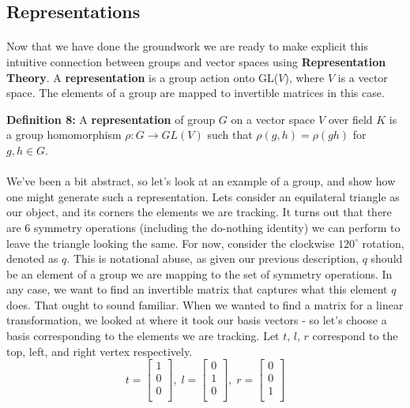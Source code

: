 \documentclass[twoside]{article}
\begin{document}
\begin{spacing}{1.25}
\section{Representations}
\paragraph*{} Now that we have done the groundwork we are ready to make 
explicit this intuitive connection between groups and vector spaces using 
\textbf{Representation Theory}. A \textbf{representation} is a group action onto GL($V$), 
where $V$ is a vector space. The elements of a group are mapped to invertible 
matrices in this case. 

\textbf{Definition 8:} A \textbf{representation} of group $G$ on a vector space 
$V$ over field $K$ is a group homomorphism $\rho: G \rightarrow GL(V)$ 
such that $\rho(g, h) = \rho(gh)$ for $g,h\in G$.

\paragraph*{} We've been a bit abstract, so let's look at an example of a group, 
and show how one might generate such a representation. Lets consider an equilateral 
triangle as our object, and its corners the elements we are tracking. It turns out 
that there are 6 symmetry operations (including the do-nothing identity) we can 
perform to leave the triangle looking the same. For now, consider the 
clockwise ${120}^{\circ}$ rotation, denoted as $q$. This is notational abuse, as given 
our previous description, $q$ should be an element of a group we are mapping to the 
set of symmetry operations. 
In any case, we want to find an invertible matrix 
that captures what this element $q$ does. That ought to sound familiar. When we wanted 
to find a matrix for a linear transformation, we looked at where it took our basis 
vectors - so let's choose a basis corresponding to the elements we are tracking. 
Let $t$, $l$, $r$ correspond to the top, left, and right vertex respectively. 
\[
t = 
\begin{bmatrix}
1 \\
0 \\
0 \\
\end{bmatrix}, \;
l = 
\begin{bmatrix}
0 \\
1 \\
0 \\
\end{bmatrix}, \;
r = 
\begin{bmatrix}
0 \\
0 \\
1 \\
\end{bmatrix}
\] 

\end{spacing}
\end{document}
